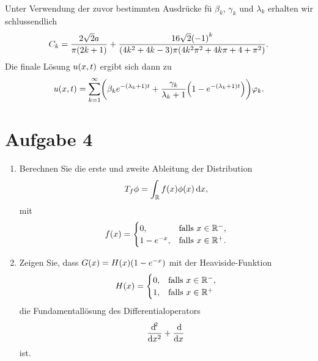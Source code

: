 \documentclass{exercise}
\begin{document}
\begin{enumerate}
\begin{align*}
        \end{align*}
        Unter Verwendung der zuvor bestimmten Ausdrücke fü \(\beta_k\), \(\gamma_k\) und \(\lambda_k\) erhalten wir schlussendlich
        \[
            C_k = \frac{2\sqrt{2}a}{\pi\parentheses*{2k + 1}} + \frac{16\sqrt{2}\parentheses*{-1}^k}{\parentheses*{4k^2 + 4k - 3}\pi\parentheses*{4k^2 \pi^2 + 4k\pi + 4 + \pi^2}}.
        \]
        Die finale Lösung \(u\parentheses*{x, t}\) ergibt sich dann zu
        \[
            u\parentheses*{x, t} = \sum_{k = 1}^\infty \parentheses*{\beta_k e^{-\parentheses*{\lambda_k + 1}t} + \frac{\gamma_k}{\lambda_k + 1}\parentheses*{1 - e^{-\parentheses*{\lambda_k + 1}t}}}\varphi_k.
        \]
    \end{enumerate}


    \section*{Aufgabe 4}
    
    \begin{problem}
        \begin{enumerate}
            \item Berechnen Sie die erste und zweite Ableitung der Distribution
            \[
                T_f \phi = \int_\R f\parentheses*{x}\phi\parentheses*{x}\d x,
            \]
            mit
            \[
                f\parentheses*{x} = \begin{cases}
                    0, & \text{falls }x \in \R^-,\\
                    1 - e^{-x}, & \text{falls }x \in \R^+.
                \end{cases}
            \]
            \item Zeigen Sie, dass \(G\parentheses*{x} = H\parentheses*{x}\parentheses*{1 - e^{-x}}\) mit der Heaviside-Funktion
            \[
                H\parentheses*{x} = \begin{cases}
                    0, & \text{falls }x \in \R^-,\\
                    1, & \text{falls }x \in \R^+
                \end{cases}
            \]
            die Fundamentallösung des Differentialoperators
            \[
                \frac{\mathop{\mathrm{d}\!}^2}{\mathop{\mathrm{d}\!} x^2} + \frac{\mathop{\mathrm{d}\!}}{\mathop{\mathrm{d}\!} x}
            \]
            ist.
        \end{enumerate}
    \end{problem}
    
\end{document}
